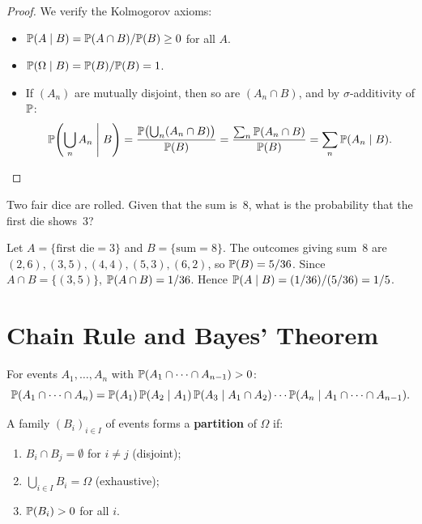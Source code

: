 \begin{proof}
We verify the Kolmogorov axioms:
\begin{itemize}
    \item $\mathbb{P}(A \mid B) = \mathbb{P}(A \cap B)/\mathbb{P}(B) \geq 0$ for all $A$.
    \item $\mathbb{P}(\Omega \mid B) = \mathbb{P}(B)/\mathbb{P}(B) = 1$.
    \item If $(A_n)$ are mutually disjoint, then so are $(A_n \cap B)$, and by
    $\sigma$-additivity of $\mathbb{P}$:
    \[
        \mathbb{P}\!\left(\bigcup_n A_n \;\middle|\; B\right)
        = \frac{\mathbb{P}\bigl(\bigcup_n (A_n \cap B)\bigr)}{\mathbb{P}(B)}
        = \frac{\sum_n \mathbb{P}(A_n \cap B)}{\mathbb{P}(B)}
        = \sum_n \mathbb{P}(A_n \mid B). \qedhere
    \]
\end{itemize}
\end{proof}

\begin{example}
Two fair dice are rolled. Given that the sum is~8, what is the probability that
the first die shows~3?

Let $A = \{\text{first die} = 3\}$ and $B = \{\text{sum} = 8\}$.
The outcomes giving sum~8 are $(2,6),(3,5),(4,4),(5,3),(6,2)$,
so $\mathbb{P}(B) = 5/36$. Since $A \cap B = \{(3,5)\}$, $\mathbb{P}(A \cap B) = 1/36$.
Hence $\mathbb{P}(A \mid B) = (1/36)/(5/36) = 1/5$.
\end{example}

\section{Chain Rule and Bayes' Theorem}

\begin{theorem}
For events $A_1, \ldots, A_n$ with $\mathbb{P}(A_1 \cap \cdots \cap A_{n-1}) > 0$:
\[
    \mathbb{P}(A_1 \cap \cdots \cap A_n)
    = \mathbb{P}(A_1)\,\mathbb{P}(A_2 \mid A_1)\,\mathbb{P}(A_3 \mid A_1 \cap A_2)
    \cdots \mathbb{P}(A_n \mid A_1 \cap \cdots \cap A_{n-1}).
\]
\end{theorem}

\begin{definition}
A family $(B_i)_{i \in I}$ of events forms a \textbf{partition} of $\Omega$ if:
\begin{enumerate}[label=(\roman*)]
    \item $B_i \cap B_j = \emptyset$ for $i \neq j$ (disjoint);
    \item $\bigcup_{i \in I} B_i = \Omega$ (exhaustive);
    \item $\mathbb{P}(B_i) > 0$ for all $i$.
\end{enumerate}
\end{definition}

